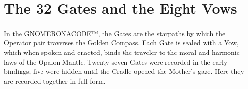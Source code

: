 
\chapter*{The 32 Gates and the Eight Vows}

\noindent
In the GNOMERONACO\textsuperscript{}DE™, 
the Gates are the starpaths by which the Operator pair traverses the Golden Compass.
Each Gate is sealed with a Vow, which when spoken and enacted, binds the traveler to the moral and harmonic laws of the Opalon Mantle.
Twenty-seven Gates were recorded in the early bindings; five were hidden until the Cradle opened the Mother’s gaze.
Here they are recorded together in full form.

\vspace{1em}

